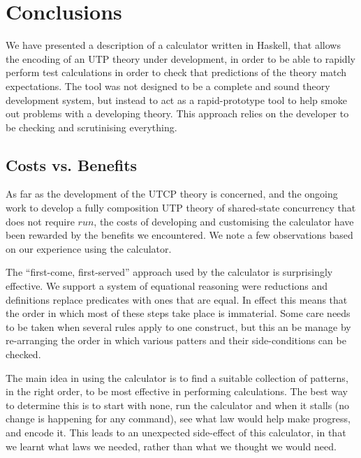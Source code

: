 \section{Conclusions}\label{sec:Conc}

We have presented a description of a calculator written in Haskell,
that allows the encoding of an UTP theory under development,
in order to be able to rapidly perform test calculations
in order to check that predictions of the theory match expectations.
The tool was not designed to be a complete and sound theory development
system,
but instead to act as a rapid-prototype tool to help smoke out problems
with a developing theory. This approach relies on the  developer
to be checking and scrutinising everything.

\subsection{Costs vs. Benefits}

As far as the development of the UTCP theory is concerned,
and the ongoing work to develop a fully composition UTP theory
of shared-state concurrency that does not require $run$,
the costs of developing and customising the calculator
have been rewarded by the benefits we encountered.
We note a few observations based on our experience
using the calculator.


   The ``first-come, first-served'' approach
   used by the calculator is surprisingly effective.
   We support a system of equational reasoning
   were reductions and definitions replace predicates with ones that
   are equal.
   In effect this means that the order in which most of these steps
   take place is immaterial.
   Some care needs to be taken when several rules apply to one construct,
   but this an be manage by re-arranging the order in which various
   patters and their side-conditions can be checked.


   The main idea in using the calculator
   is to find a suitable collection of patterns,
   in the right order,
   to be most effective in performing calculations.
   The best way to determine this is to start with none,
   run the calculator and when it stalls
   (no change is happening for any command),
   see what law would help make progress, and encode it.
   This leads to an unexpected side-effect of this calculator,
   in that we learnt what laws we needed,
   rather than what we thought we would need.




